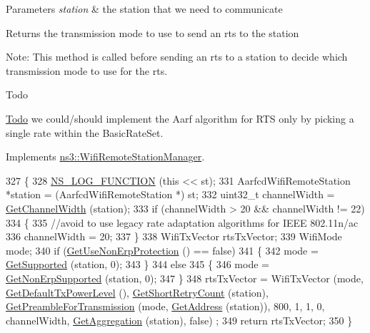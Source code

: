 \begin{DoxyParams}{Parameters}
{\em station} & the station that we need to communicate\\
\hline
\end{DoxyParams}
\begin{DoxyReturn}{Returns}
the transmission mode to use to send an rts to the station
\end{DoxyReturn}
Note\+: This method is called before sending an rts to a station to decide which transmission mode to use for the rts. \begin{DoxyRefDesc}{Todo}
\item[\hyperlink{todo__todo000167}{Todo}]we could/should implement the Aarf algorithm for R\+TS only by picking a single rate within the Basic\+Rate\+Set. \end{DoxyRefDesc}


Implements \hyperlink{classns3_1_1WifiRemoteStationManager_abf44eccb31d4b1b58644fd6721d132c9}{ns3\+::\+Wifi\+Remote\+Station\+Manager}.


\begin{DoxyCode}
327 \{
328   \hyperlink{log-macros-disabled_8h_a90b90d5bad1f39cb1b64923ea94c0761}{NS\_LOG\_FUNCTION} (\textcolor{keyword}{this} << st);
331   AarfcdWifiRemoteStation *station = (AarfcdWifiRemoteStation *) st;
332   uint32\_t channelWidth = \hyperlink{classns3_1_1WifiRemoteStationManager_a918213c5b9fa629c4986f6d90521bbd4}{GetChannelWidth} (station);
333   \textcolor{keywordflow}{if} (channelWidth > 20 && channelWidth != 22)
334     \{
335       \textcolor{comment}{//avoid to use legacy rate adaptation algorithms for IEEE 802.11n/ac}
336       channelWidth = 20;
337     \}
338   WifiTxVector rtsTxVector;
339   WifiMode mode;
340   \textcolor{keywordflow}{if} (\hyperlink{classns3_1_1WifiRemoteStationManager_a2d3d93f08995e554960a177a52f90f2f}{GetUseNonErpProtection} () == \textcolor{keyword}{false})
341     \{
342       mode = \hyperlink{classns3_1_1WifiRemoteStationManager_a995c8bae0d84b168fd3e8bc9ecaacdd4}{GetSupported} (station, 0);
343     \}
344   \textcolor{keywordflow}{else}
345     \{
346       mode = \hyperlink{classns3_1_1WifiRemoteStationManager_a3df8f1931f1fce653e5990a2821b44c6}{GetNonErpSupported} (station, 0);
347     \}
348   rtsTxVector = WifiTxVector (mode, \hyperlink{classns3_1_1WifiRemoteStationManager_acff2fc859ee6b4c66ea7a83dd075b5d6}{GetDefaultTxPowerLevel} (), 
      \hyperlink{classns3_1_1WifiRemoteStationManager_ad61157a9a56cf668f3255730f6a416b2}{GetShortRetryCount} (station), \hyperlink{classns3_1_1WifiRemoteStationManager_a0f44967cbd7488baada4802ebc642110}{GetPreambleForTransmission} (mode,
       \hyperlink{classns3_1_1WifiRemoteStationManager_ac9ccc8c514bd8d2af05c290e63461a2a}{GetAddress} (station)), 800, 1, 1, 0, channelWidth, \hyperlink{classns3_1_1WifiRemoteStationManager_a5421c8d510cb16eebeac9f2ea9dd73c3}{GetAggregation} (station), \textcolor{keyword}{false})
      ;
349   \textcolor{keywordflow}{return} rtsTxVector;
350 \}
\end{DoxyCode}


